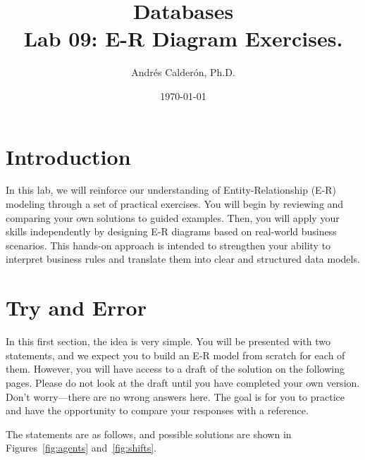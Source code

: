 \documentclass{article}
\title{Databases \\ Lab 09: E-R Diagram Exercises.}
\author{Andrés Calderón, Ph.D.}
\date{\today}
\begin{document}
\maketitle

\section{Introduction}

In this lab, we will reinforce our understanding of Entity-Relationship (E-R) modeling through a set of practical exercises. You will begin by reviewing and comparing your own solutions to guided examples. Then, you will apply your skills independently by designing E-R diagrams based on real-world business scenarios. This hands-on approach is intended to strengthen your ability to interpret business rules and translate them into clear and structured data models.

\section{Try and Error} \label{sec:try}
In this first section, the idea is very simple. You will be presented with two statements, and we expect you to build an E-R model from scratch for each of them. However, you will have access to a draft of the solution on the following pages. Please do not look at the draft until you have completed your own version. Don’t worry—there are no wrong answers here. The goal is for you to practice and have the opportunity to compare your responses with a reference.

The statements are as follows, and possible solutions are shown in Figures~\ref{fig:agents} and~\ref{fig:shifts}.
\end{document}
